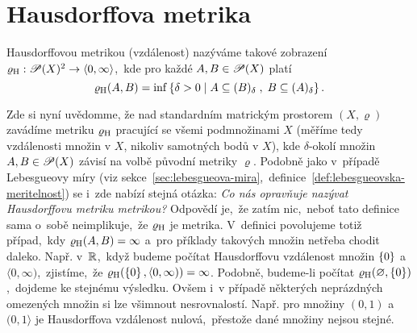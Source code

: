 \section{Hausdorffova metrika}\label{sec:hausdorffova-metrika}

\begin{definition}\label{def:hausdorffova-metrika}
    Hausdorffovou metrikou (vzdálenost) nazýváme takové zobrazení $\varrho_\textup{H}:\mathscr{P}(X)^2 \rightarrow \langle0,\infty\rangle$,~kde pro každé $A,B\in\mathscr{P}(X)$ platí
    \[\varrho_\textup{H}(A,B)=\inf\left\{\delta>0\;\middle|\;A\subseteq (B)_\delta\;,\;B\subseteq (A)_\delta\right\}.\]
\end{definition}
Zde si nyní uvědomme, že nad standardním matrickým prostorem $(X,\varrho)$ zavádíme metriku $\varrho_\textup{H}$ pracující se všemi podmnožinami $X$ (měříme tedy vzdálenosti množin v $X$, nikoliv samotných bodů v $X$), kde $\delta$-okolí množin $A,B\in\mathscr{P}(X)$ závisí na volbě původní metriky $\varrho$. Podobně jako v~případě Lebesgueovy míry (viz sekce~\ref{sec:lebesgueova-mira},~definice~\ref{def:lebesgueovska-meritelnost}) se i~zde nabízí stejná otázka: \emph{Co nás opravňuje nazývat Hausdorffovu metriku metrikou?} Odpovědí je,~že zatím nic,~neboť tato definice sama o~sobě neimplikuje,~že $\varrho_\textup{H}$ je metrika. V~definici povolujeme totiž případ,~kdy $\varrho_\textup{H}(A,B)=\infty$ a~pro příklady takových množin netřeba chodit daleko. Např. v~$\mathbb{R}$,~když budeme počítat Hausdorffovu vzdálenost množin $\left\{0\right\}$ a~$\langle 0,\infty)$,~zjistíme,~že $\varrho_\textup{H}(\left\{0\right\},\langle 0,\infty))=\infty$. Podobně, budeme-li počítat $\varrho_\textup{H}(\varnothing,\left\{0\right\})$,~dojdeme ke stejnému výsledku. Ovšem i~v případě některých neprázdných omezených množin si lze všimnout nesrovnalostí. Např. pro množiny $(0,1)$ a~$(0,1\rangle$ je Hausdorffova vzdálenost nulová,~přestože dané množiny nejsou stejné.

